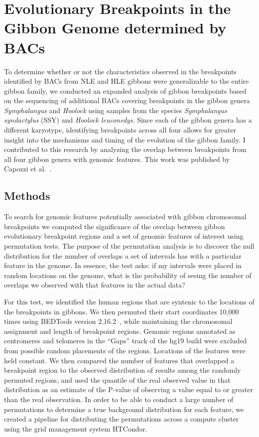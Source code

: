 \section{Evolutionary Breakpoints in the Gibbon Genome determined by BACs}

To determine whether or not the characteristics observed in the breakpoints identified by BACs from NLE and HLE gibbons were generalizable to the entire gibbon family, we conducted an expanded analysis of gibbon breakpoints based on the sequencing of additional BACs covering breakpoints in the gibbon genera \emph{Symphalangus} and \emph{Hoolock} using samples from the species \emph{Symphalangus syndactylus} (SSY) and \emph{Hoolock leuconedys}. Since each of the gibbon genera has a different karyotype, identifying breakpoints across all four allows for greater insight into the mechanisms and timing of the evolution of the gibbon family. I contributed to this research by analyzing the overlap between breakpoints from all four gibbon genera with genomic features. This work was published by Capozzi et al.~\cite{Capozzi:2012bb}.

\subsection{Methods}

To search for genomic features potentially associated with gibbon chromosomal breakpoints we computed the significance of the overlap between gibbon evolutionary breakpoint regions and a set of genomic features of interest using permutation tests. The purpose of the permutation analysis is to discover the null distribution for the number of overlaps a set of intervals has with a particular feature in the genome. In essence, the test asks: if my intervals were placed in random locations on the genome, what is the probability of seeing the number of overlaps we observed with that features in the actual data? 

For this test, we identified the human regions that are syntenic to the locations of the breakpoints in gibbons. We then permuted their start coordinates 10,000 times using BEDTools version 2.16.2~\cite{Quinlan:2010km}, while maintaining the chromosomal assignment and length of breakpoint regions. Genomic regions annotated as centromeres and telomeres in the ``Gaps'' track of the hg19 build were excluded from possible random placements of the regions. Locations of the features were held constant. We then compared the number of features that overlapped a breakpoint region to the observed distribution of results among the randomly permuted regions, and used the quantile of the real observed value in that distribution as an estimate of the P-value of observing a value equal to or greater than the real observation. In order to be able to conduct a large number of permutations to determine a true background distribution for each feature, we created a pipeline for distributing the permutations across a compute cluster using the grid management system HTCondor.

